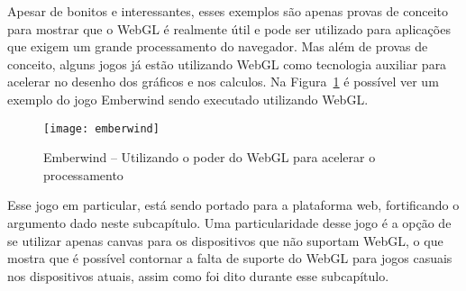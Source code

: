 Apesar de bonitos e interessantes, esses exemplos são apenas provas de
conceito para mostrar que o WebGL é realmente útil e pode ser
utilizado para aplicações que exigem um grande processamento do
navegador. Mas além de provas de conceito, alguns jogos já estão
utilizando WebGL como tecnologia auxiliar para acelerar no desenho dos
gráficos e nos calculos.
Na Figura~\ref{img:emberwind} é possível ver um exemplo do jogo Emberwind
sendo executado utilizando WebGL.

\begin{figure}[H]
  \centering
	\texttt{[image: emberwind]}
  \caption{Emberwind {--} Utilizando o poder do WebGL para acelerar o processamento}
  \label{img:emberwind}
\end{figure}

Esse jogo em particular, está sendo portado para a plataforma web,
fortificando o argumento dado neste subcapítulo. Uma particularidade
desse jogo é a opção de se utilizar apenas canvas para os dispositivos
que não suportam WebGL, o que mostra que é possível contornar a falta
de suporte do WebGL para jogos casuais nos dispositivos atuais, assim
como foi dito durante esse subcapítulo.

\clearpage
